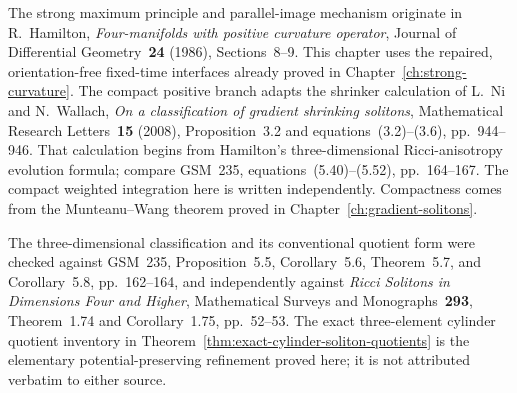 \documentclass[10pt]{coll-l}
\theoremstyle{definition}
\theoremstyle{remark}
\numberwithin{section}{chapter}
\numberwithin{equation}{chapter}
\begin{document}
\begin{sloppypar}
The strong maximum principle and parallel-image mechanism originate in
R.~Hamilton, \emph{Four-manifolds with positive curvature operator},
Journal of Differential Geometry~\textbf{24} (1986), Sections~8--9.  This
chapter uses the repaired, orientation-free fixed-time interfaces already
proved in Chapter~\ref{ch:strong-curvature}.  The compact positive branch
adapts the shrinker calculation of L.~Ni and N.~Wallach,
\emph{On a classification of gradient shrinking solitons}, Mathematical
Research Letters~\textbf{15} (2008), Proposition~3.2 and
equations~(3.2)--(3.6), pp.~944--946.  That calculation begins from
Hamilton's three-dimensional Ricci-anisotropy evolution formula; compare
GSM~235, equations~(5.40)--(5.52), pp.~164--167.  The compact weighted
integration here is written independently.  Compactness comes from the
Munteanu--Wang theorem proved in Chapter~\ref{ch:gradient-solitons}.
\end{sloppypar}

The three-dimensional classification and its conventional quotient form
were checked against GSM~235, Proposition~5.5, Corollary~5.6,
Theorem~5.7, and Corollary~5.8, pp.~162--164, and independently against
\emph{Ricci Solitons in Dimensions Four and Higher}, Mathematical Surveys
and Monographs~\textbf{293}, Theorem~1.74 and Corollary~1.75, pp.~52--53.
The exact three-element cylinder quotient inventory in
Theorem~\ref{thm:exact-cylinder-soliton-quotients} is the elementary
potential-preserving refinement proved here; it is not attributed verbatim
to either source.
\end{document}
